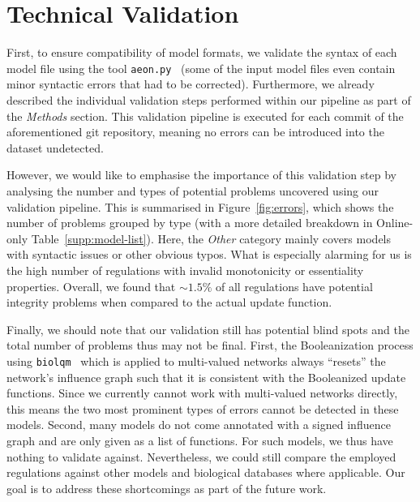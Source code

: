 \documentclass[fleqn,10pt]{wlscirep}
\begin{document}
\section*{Technical Validation}

First, to ensure compatibility of model formats, we validate the syntax of each model file using the tool \texttt{aeon.py}~\cite{aeonpy} (some of the input model files even contain minor syntactic errors that had to be corrected). Furthermore, we already described the individual validation steps performed within our pipeline as part of the \emph{Methods} section. This validation pipeline is executed for each commit of the aforementioned git repository, meaning no errors can be introduced into the dataset undetected. 

However, we would like to emphasise the importance of this validation step by analysing the number and types of potential problems uncovered using our validation pipeline. This is summarised in Figure~\ref{fig:errors}, which shows the number of problems grouped by type (with a more detailed breakdown in Online-only Table~\ref{supp:model-list}). Here, the \emph{Other} category mainly covers models with syntactic issues or other obvious typos. What is especially alarming for us is the high number of regulations with invalid monotonicity or essentiality properties. Overall, we found that $\sim1.5\%$ of all regulations have potential integrity problems when compared to the actual update function.

Finally, we should note that our validation still has potential blind spots and the total number of problems thus may not be final. First, the Booleanization process using \texttt{biolqm}~\cite{biolqm} which is applied to multi-valued networks always ``resets'' the network's influence graph such that it is consistent with the Booleanized update functions. Since we currently cannot work with multi-valued networks directly, this means the two most prominent types of errors cannot be detected in these models. Second, many models do not come annotated with a signed influence graph and are only given as a list of functions. For such models, we thus have nothing to validate against. Nevertheless, we could still compare the employed regulations against other models and biological databases where applicable. Our goal is to address these shortcomings as part of the future work. 

\end{document}
